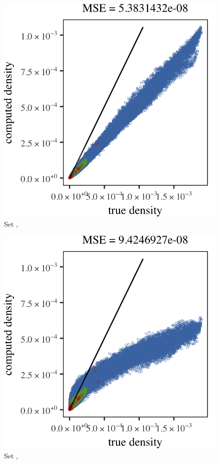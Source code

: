 \begin{subfigure}{0.23\textwidth}
	\centering
	\includegraphics[keepaspectratio=true, width=\textwidth, height=0.23\textheight]{4/img/all/results_baakman_2_60000_mbe_silverman}
	\caption{Set \baakmanTwo, \mbe}
	\label{fig:4:results:mbe:baakman2}
\end{subfigure}
\begin{subfigure}{0.23\textwidth}
	\centering
	\includegraphics[keepaspectratio=true, width=\textwidth, height=0.23\textheight]{4/img/all/results_baakman_2_60000_sambe_silverman}
	\caption{Set \baakmanTwo, \sambe}
	\label{fig:4:simulated:datasets:sambe:baakman2}
\end{subfigure}
